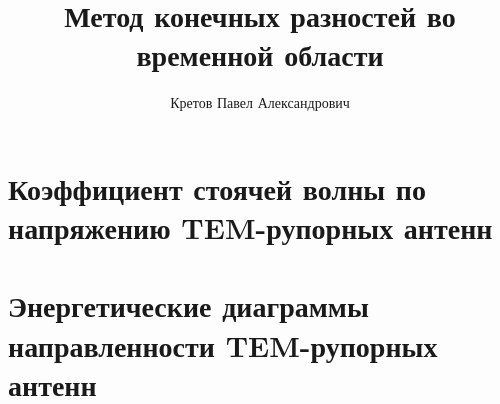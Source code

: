 %




\title{Метод конечных разностей во временной области}
\author{Кретов Павел Александрович}
\date{}


    
	
    
	

	

	
	
	
	
    
    
    

	\chapter{Коэффициент стоячей волны по напряжению TEM-рупорных антенн}
	
	
	

    \chapter{Энергетические диаграммы направленности TEM-рупорных антенн}
    
	
	

	
	


